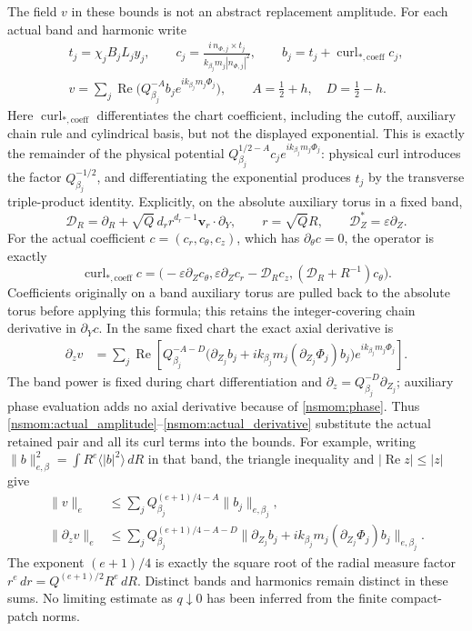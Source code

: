 \documentclass[11pt]{article}
\begin{document}
The field $v$ in these bounds is not an abstract replacement amplitude.
For each actual band and harmonic write
\begin{gather}
 t_j=\chi_jB_jL_jy_j,\qquad
 c_j=\frac{i\,n_{\Phi,j}\times t_j}
                  {k_{\beta_j}m_j|n_{\Phi,j}|^2},\qquad
 b_j=t_j+\operatorname{curl}_{*,\mathrm{coeff}}c_j,\nonumber\\
 v=\sum_j\operatorname{Re}
       \bigl(Q_{\beta_j}^{-A}b_j e^{ik_{\beta_j}m_j\Phi_j}\bigr),
 \qquad A=\tfrac12+h,\quad D=\tfrac12-h.
 \label{nsmom:actual_amplitude}
\end{gather}
Here $\operatorname{curl}_{*,\mathrm{coeff}}$ differentiates the chart
coefficient, including the cutoff, auxiliary chain rule and cylindrical
basis, but not the displayed exponential. This is exactly the
remainder of the physical potential
$Q_{\beta_j}^{1/2-A}c_j e^{ik_{\beta_j}m_j\Phi_j}$: physical curl
introduces the factor $Q_{\beta_j}^{-1/2}$, and differentiating the
exponential produces $t_j$ by the transverse triple-product identity.
Explicitly, on the absolute auxiliary torus in a fixed band,
\[
 \mathscr D_R=\partial_R+
 \sqrt Q\,d_r r^{d_r-1}\mathbf v_r\cdot\partial_Y,
 \qquad r=\sqrt Q R,\qquad \mathscr D_Z^*=\varepsilon\partial_Z.
\]
For the actual coefficient $c=(c_r,c_\theta,c_z)$, which has
$\partial_\theta c=0$, the operator is exactly
\[
 \operatorname{curl}_{*,\mathrm{coeff}}c
 =\bigl(-\varepsilon\partial_Zc_\theta,
       \varepsilon\partial_Zc_r-\mathscr D_Rc_z,
       (\mathscr D_R+R^{-1})c_\theta\bigr).
\]
Coefficients originally on a band auxiliary torus are pulled back to
the absolute torus before applying this formula; this retains the
integer-covering chain derivative in $\partial_Yc$.
In the same fixed chart the exact axial derivative is
\begin{align}
 \partial_zv
 &=\sum_j\operatorname{Re}\left[
 Q_{\beta_j}^{-A-D}
 \bigl(\partial_{Z_j}b_j+
   ik_{\beta_j}m_j(\partial_{Z_j}\Phi_j)b_j\bigr)
 e^{ik_{\beta_j}m_j\Phi_j}\right].
 \label{nsmom:actual_derivative}
\end{align}
The band power is fixed during chart differentiation and
$\partial_z=Q_{\beta_j}^{-D}\partial_{Z_j}$; auxiliary phase evaluation
adds no axial derivative because of \eqref{nsmom:phase}. Thus
\eqref{nsmom:actual_amplitude}--\eqref{nsmom:actual_derivative} substitute
the actual retained pair and all its curl terms into the bounds.
For example, writing
$\|b\|_{e,\beta}^2=\int R^e\langle|b|^2\rangle\,dR$ in that band,
the triangle inequality and $|\operatorname{Re}z|\le|z|$ give
\begin{align}
 \|v\|_e
 &\le\sum_j Q_{\beta_j}^{(e+1)/4-A}\|b_j\|_{e,\beta_j},
 \label{nsmom:scale_bound}\\
 \|\partial_zv\|_e
 &\le\sum_j Q_{\beta_j}^{(e+1)/4-A-D}
 \|\partial_{Z_j}b_j+
 ik_{\beta_j}m_j(\partial_{Z_j}\Phi_j)b_j\|_{e,\beta_j}.
 \label{nsmom:scale_derivative_bound}
\end{align}
The exponent $(e+1)/4$ is exactly the square root of the radial measure
factor $r^e\,dr=Q^{(e+1)/2}R^e\,dR$. Distinct bands and harmonics
remain distinct in these sums. No limiting estimate as $q\downarrow0$
has been inferred from the finite compact-patch norms.
\end{document}
